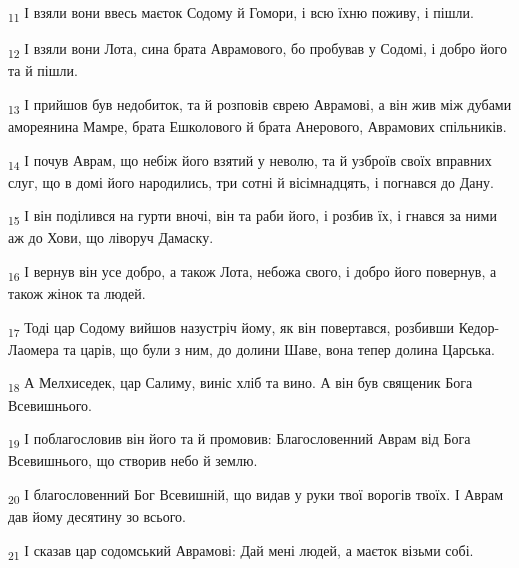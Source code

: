 \begin{tcolorbox}
\textsubscript{11} І взяли вони ввесь маєток Содому й Гомори, і всю їхню поживу, і пішли.
\end{tcolorbox}
\begin{tcolorbox}
\textsubscript{12} І взяли вони Лота, сина брата Аврамового, бо пробував у Содомі, і добро його та й пішли.
\end{tcolorbox}
\begin{tcolorbox}
\textsubscript{13} І прийшов був недобиток, та й розповів єврею Аврамові, а він жив між дубами амореянина Мамре, брата Ешколового й брата Анерового, Аврамових спільників.
\end{tcolorbox}
\begin{tcolorbox}
\textsubscript{14} І почув Аврам, що небіж його взятий у неволю, та й узброїв своїх вправних слуг, що в домі його народились, три сотні й вісімнадцять, і погнався до Дану.
\end{tcolorbox}
\begin{tcolorbox}
\textsubscript{15} І він поділився на гурти вночі, він та раби його, і розбив їх, і гнався за ними аж до Хови, що ліворуч Дамаску.
\end{tcolorbox}
\begin{tcolorbox}
\textsubscript{16} І вернув він усе добро, а також Лота, небожа свого, і добро його повернув, а також жінок та людей.
\end{tcolorbox}
\begin{tcolorbox}
\textsubscript{17} Тоді цар Содому вийшов назустріч йому, як він повертався, розбивши Кедор-Лаомера та царів, що були з ним, до долини Шаве, вона тепер долина Царська.
\end{tcolorbox}
\begin{tcolorbox}
\textsubscript{18} А Мелхиседек, цар Салиму, виніс хліб та вино. А він був священик Бога Всевишнього.
\end{tcolorbox}
\begin{tcolorbox}
\textsubscript{19} І поблагословив він його та й промовив: Благословенний Аврам від Бога Всевишнього, що створив небо й землю.
\end{tcolorbox}
\begin{tcolorbox}
\textsubscript{20} І благословенний Бог Всевишній, що видав у руки твої ворогів твоїх. І Аврам дав йому десятину зо всього.
\end{tcolorbox}
\begin{tcolorbox}
\textsubscript{21} І сказав цар содомський Аврамові: Дай мені людей, а маєток візьми собі.
\end{tcolorbox}
